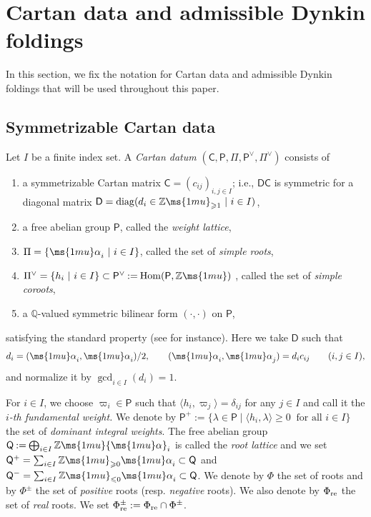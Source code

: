 \documentclass[12pt, leqno]{amsart}
\numberwithin{equation}{section}
\theoremstyle{plain}
\theoremstyle{definition}
\renewcommand{\le}{\leqslant}
\renewcommand{\ge}{\geqslant}
\newcommand{\seteq}{\mathbin{:=}}
\newcommand{\Q}{\mathbb{Q}}
\newcommand{\Z}{\mathbb{Z}\ms{1mu}}
\newcommand{\al}{{\ms{1mu}\alpha}}
\newcommand{\re}{{\rm re}}
\newcommand{\Hom}{\operatorname{Hom}}
\newcommand{\sfC}{\mathsf{C}}
\newcommand{\sfD}{\mathsf{D}}
\newcommand{\sfP}{\mathsf{P}}
\newcommand{\sfQ}{\mathsf{Q}}
\newcommand{\wl}{\sfP}
\newcommand{\rl}{\sfQ}
\newcommand{\lan}{\langle}
\newcommand{\ran}{\rangle}
\newcommand{\ee}{\end{enumerate}}
\newcommand{\bna}{\begin{enumerate}[{\rm (a)}]}
\begin{document}
\section{Cartan data and admissible Dynkin foldings} \label{sec: Cartan data}
In this section, we fix the notation for Cartan data and admissible Dynkin foldings that will be used throughout this paper.

\subsection{Symmetrizable Cartan data}

Let $I$ be a finite index set. A \emph{Cartan datum} $(\sfC,\wl,\Pi,\wl^\vee,\Pi^\vee)$ consists of \bna
\item a symmetrizable Cartan matrix
$\sfC=(c_{ij})_{i,j\in I}$; i.e., $\sfD\sfC$ is symmetric for a diagonal matrix $\sfD={\rm diag}(d_i \in \Z_{\ge1} \ | \ i \in I)$,
\item  a free abelian group $\wl$, called the \emph{weight lattice},
\item $\Pi=\{ \al_i \ | \ i \in I \}$, called the set of \emph{simple roots},
\item  $\Pi^\vee=\{ h_i \ | \ i \in I \} \subset \wl^\vee \seteq \Hom(\wl,\Z)$ , called the set of \emph{simple coroots},
\item a $\Q$-valued symmetric bilinear form $( \cdot,\cdot)$ on $\wl$,
\ee
satisfying the standard property (see \cite[\S 1.1]{KKKO18} for instance). Here we take $\sfD$ such that
\begin{align} \label{eq: d_i and pairing}
d_i=(\al_i,\al_i)/2,
\qquad
(\al_i,\al_j)=d_i c_{ij}
\qquad (i,j\in I),
\end{align}
and normalize it by $\gcd_{i\in I}(d_i)=1$.


For $i \in I$, we choose $\varpi_i \in \wl$ such that $\lan h_i,\varpi_j \ran =\delta_{ij}$ for any $j \in I$ and call it the \emph{$i$-th fundamental weight.} We denote by
$\wl^+ \seteq \{\lambda\in \wl\mid \langle h_i,\lambda\rangle\geq 0 \ \text{ for all } i\in I \}$ the set of \emph{dominant integral weights}.
The free abelian group $\rl \seteq \bigoplus_{i \in I} \Z \al_i$ is called the \emph{root lattice} and we set $\rl^+ = \sum_{i \in I}\Z_{\ge 0} \al_i \subset \rl$ and $\rl^- = \sum_{i \in I}\Z_{\le 0} \al_i \subset \rl$. We denote by $\Phi$ the set of roots and by $\Phi^\pm$ the set of \emph{positive} roots (resp. \emph{negative} roots). We also denote by $\Phi_{{\rm re}}$ the set of \emph{real} roots.
We set $\Phi_{\re}^{\pm}:=\Phi_{\re}\cap\Phi^\pm$.
\end{document}

